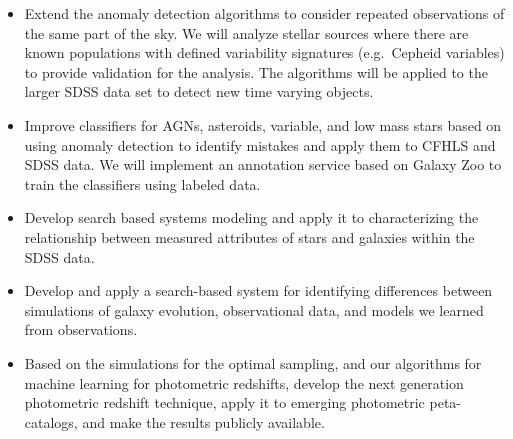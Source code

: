 \documentclass[useAMS,usenatbib,tightenlines,11pt,preprint]{aastex}
\begin{document}

\begin{itemize}

\item Extend the anomaly detection algorithms to consider repeated
 observations of the same part of the sky.  We will analyze stellar
 sources where there are known populations with defined variability
 signatures (e.g.\ Cepheid variables) to provide validation for the
 analysis.  The algorithms will be applied to the larger SDSS data set to
 detect new time varying objects.

\item Improve classifiers for AGNs, asteroids, variable, and low mass stars
 based on using anomaly detection to identify mistakes and apply them to
 CFHLS and SDSS data.  We will implement an annotation service based on
 Galaxy Zoo to train the classifiers using labeled data.

\end{itemize}


\begin{itemize}

\item Develop search based systems modeling and apply it to characterizing
the relationship between measured attributes of stars and galaxies within
the SDSS data.

\item Develop and apply a search-based system for identifying differences
between simulations of galaxy evolution, observational data, and models
we learned from observations.

\item Based on the simulations for the optimal sampling, and our algorithms
 for machine learning for photometric redshifts, develop the next
 generation photometric redshift technique, apply it to emerging
 photometric peta-catalogs, and make the results publicly available.

\end{itemize}

\newpage
\end{document}
